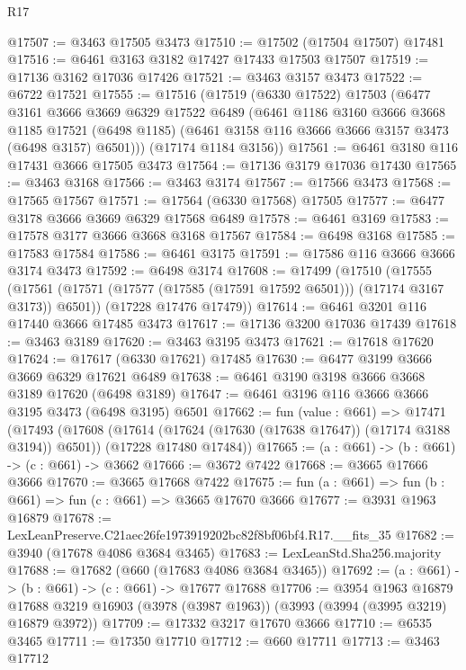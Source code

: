 \begin{lexlean}{R17}
\begin{coremodule}
@17507 := @3463 @17505 @3473
@17510 := @17502 (@17504 @17507) @17481
@17516 := @6461 @3163 @3182 @17427 @17433 @17503 @17507
@17519 := @17136 @3162 @17036 @17426
@17521 := @3463 @3157 @3473
@17522 := @6722 @17521
@17555 := @17516
    (@17519
      (@6330 @17522)
      @17503
      (@6477
        @3161
        @3666
        @3669
        @6329
        @17522
        @6489
        (@6461
          @1186
          @3160
          @3666
          @3668
          @1185
          @17521
          (@6498 @1185)
          (@6461 @3158 @116 @3666 @3666 @3157 @3473 (@6498 @3157) @6501)))
      (@17174 @1184 @3156))
@17561 := @6461 @3180 @116 @17431 @3666 @17505 @3473
@17564 := @17136 @3179 @17036 @17430
@17565 := @3463 @3168
@17566 := @3463 @3174
@17567 := @17566 @3473
@17568 := @17565 @17567
@17571 := @17564 (@6330 @17568) @17505
@17577 := @6477 @3178 @3666 @3669 @6329 @17568 @6489
@17578 := @6461 @3169
@17583 := @17578 @3177 @3666 @3668 @3168 @17567
@17584 := @6498 @3168
@17585 := @17583 @17584
@17586 := @6461 @3175
@17591 := @17586 @116 @3666 @3666 @3174 @3473
@17592 := @6498 @3174
@17608 := @17499
    (@17510
      (@17555 (@17561 (@17571 (@17577 (@17585 (@17591 @17592 @6501))) (@17174 @3167 @3173)) @6501))
      (@17228 @17476 @17479))
@17614 := @6461 @3201 @116 @17440 @3666 @17485 @3473
@17617 := @17136 @3200 @17036 @17439
@17618 := @3463 @3189
@17620 := @3463 @3195 @3473
@17621 := @17618 @17620
@17624 := @17617 (@6330 @17621) @17485
@17630 := @6477 @3199 @3666 @3669 @6329 @17621 @6489
@17638 := @6461 @3190 @3198 @3666 @3668 @3189 @17620 (@6498 @3189)
@17647 := @6461 @3196 @116 @3666 @3666 @3195 @3473 (@6498 @3195) @6501
@17662 := fun (value : @661) =>
  @17471
    (@17493
      (@17608 (@17614 (@17624 (@17630 (@17638 @17647)) (@17174 @3188 @3194)) @6501))
      (@17228 @17480 @17484))
@17665 := (a : @661) -> (b : @661) -> (c : @661) -> @3662
@17666 := @3672 @7422
@17668 := @3665 @17666 @3666
@17670 := @3665 @17668 @7422
@17675 := fun (a : @661) => fun (b : @661) => fun (c : @661) => @3665 @17670 @3666
@17677 := @3931 @1963 @16879
@17678 := LexLeanPreserve.C21aec26fe1973919202bc82f8bf06bf4.R17.__fits_35
@17682 := @3940 (@17678 @4086 @3684 @3465)
@17683 := LexLeanStd.Sha256.majority
@17688 := @17682 (@660 (@17683 @4086 @3684 @3465))
@17692 := (a : @661) -> (b : @661) -> (c : @661) -> @17677 @17688
@17706 := @3954
    @1963
    @16879
    @17688
    @3219
    @16903
    (@3978 (@3987 @1963))
    (@3993 (@3994 (@3995 @3219) @16879 @3972))
@17709 := @17332 @3217 @17670 @3666
@17710 := @6535 @3465
@17711 := @17350 @17710
@17712 := @660 @17711
@17713 := @3463 @17712

\end{coremodule}
\end{lexlean}
